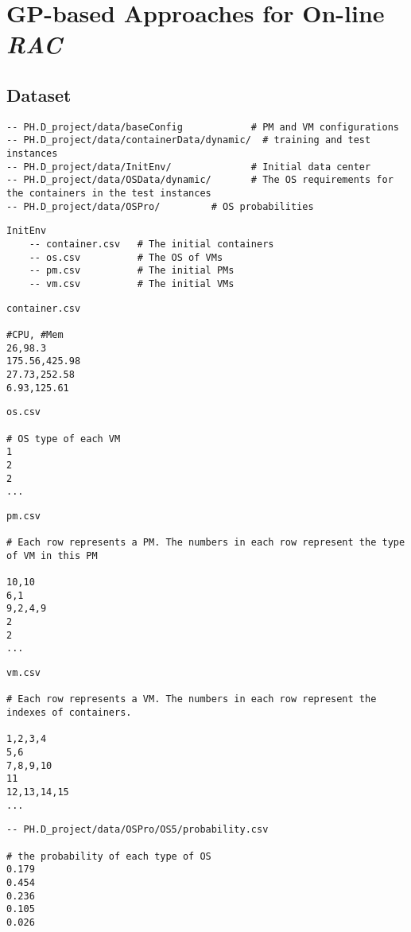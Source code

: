\chapter{GP-based Approaches for On-line \emph{RAC}}


\section{Dataset}
\begin{lstlisting}
-- PH.D_project/data/baseConfig            # PM and VM configurations
-- PH.D_project/data/containerData/dynamic/  # training and test instances
-- PH.D_project/data/InitEnv/              # Initial data center
-- PH.D_project/data/OSData/dynamic/	   # The OS requirements for the containers in the test instances 
-- PH.D_project/data/OSPro/			# OS probabilities
\end{lstlisting}

\begin{lstlisting}
InitEnv
	-- container.csv   # The initial containers
	-- os.csv		   # The OS of VMs	
	-- pm.csv		   # The initial PMs
	-- vm.csv          # The initial VMs
\end{lstlisting}

\begin{lstlisting}
container.csv

#CPU, #Mem
26,98.3
175.56,425.98
27.73,252.58
6.93,125.61
\end{lstlisting}

\begin{lstlisting}
os.csv

# OS type of each VM
1
2
2
...
\end{lstlisting}

\begin{lstlisting}
pm.csv

# Each row represents a PM. The numbers in each row represent the type of VM in this PM

10,10
6,1
9,2,4,9
2
2
...
\end{lstlisting}

\begin{lstlisting}
vm.csv

# Each row represents a VM. The numbers in each row represent the indexes of containers.

1,2,3,4
5,6
7,8,9,10
11
12,13,14,15
...
\end{lstlisting}

\begin{lstlisting}
-- PH.D_project/data/OSPro/OS5/probability.csv

# the probability of each type of OS
0.179
0.454
0.236
0.105
0.026
\end{lstlisting}


